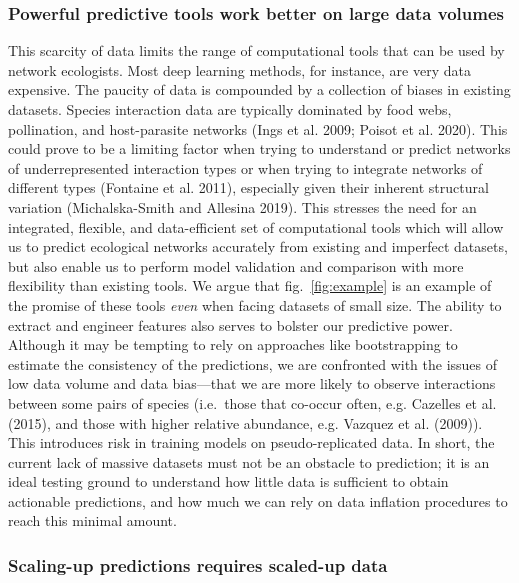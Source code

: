 \documentclass[11pt]{article}
\begin{document}
\hypertarget{powerful-predictive-tools-work-better-on-large-data-volumes}{%
\subsubsection{Powerful predictive tools work better on large data
volumes}\label{powerful-predictive-tools-work-better-on-large-data-volumes}}

This scarcity of data limits the range of computational tools that can
be used by network ecologists. Most deep learning methods, for instance,
are very data expensive. The paucity of data is compounded by a
collection of biases in existing datasets. Species interaction data are
typically dominated by food webs, pollination, and host-parasite
networks (Ings et al. 2009; Poisot et al. 2020). This could prove to be
a limiting factor when trying to understand or predict networks of
underrepresented interaction types or when trying to integrate networks
of different types (Fontaine et al. 2011), especially given their
inherent structural variation (Michalska-Smith and Allesina 2019). This
stresses the need for an integrated, flexible, and data-efficient set of
computational tools which will allow us to predict ecological networks
accurately from existing and imperfect datasets, but also enable us to
perform model validation and comparison with more flexibility than
existing tools. We argue that fig.~\ref{fig:example} is an example of
the promise of these tools \emph{even} when facing datasets of small
size. The ability to extract and engineer features also serves to
bolster our predictive power. Although it may be tempting to rely on
approaches like bootstrapping to estimate the consistency of the
predictions, we are confronted with the issues of low data volume and
data bias---that we are more likely to observe interactions between some
pairs of species (i.e.~those that co-occur often, e.g. Cazelles et al.
(2015), and those with higher relative abundance, e.g. Vazquez et al.
(2009)). This introduces risk in training models on pseudo-replicated
data. In short, the current lack of massive datasets must not be an
obstacle to prediction; it is an ideal testing ground to understand how
little data is sufficient to obtain actionable predictions, and how much
we can rely on data inflation procedures to reach this minimal amount.

\hypertarget{scaling-up-predictions-requires-scaled-up-data}{%
\subsubsection{Scaling-up predictions requires scaled-up
data}\label{scaling-up-predictions-requires-scaled-up-data}}
\end{document}
